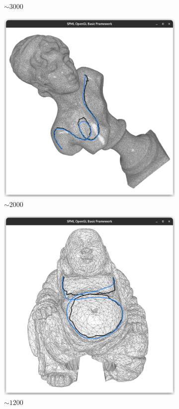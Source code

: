\documentclass{stdlocal}
\begin{document}
\begin{figure}
\begin{subfigure}[b]{0.24\linewidth}
    \caption{$\sim 3000$}
  \end{subfigure}
  \begin{subfigure}[b]{0.24\linewidth}
    \centering
    \includegraphics[width=\linewidth,trim={25px 20 25 50},clip]{images/sappho-smooth-0.95.png}
    \caption{$\sim 2000$}
  \end{subfigure}
  \begin{subfigure}[b]{0.24\linewidth}
    \centering
    \includegraphics[width=\linewidth,trim={25px 20 25 50},clip]{images/buddha-smooth-0.95.png}
    \caption{$\sim 1200$}
  \end{subfigure}
  \caption[]{}
  \label{fig:}
\end{figure}
\end{document}
